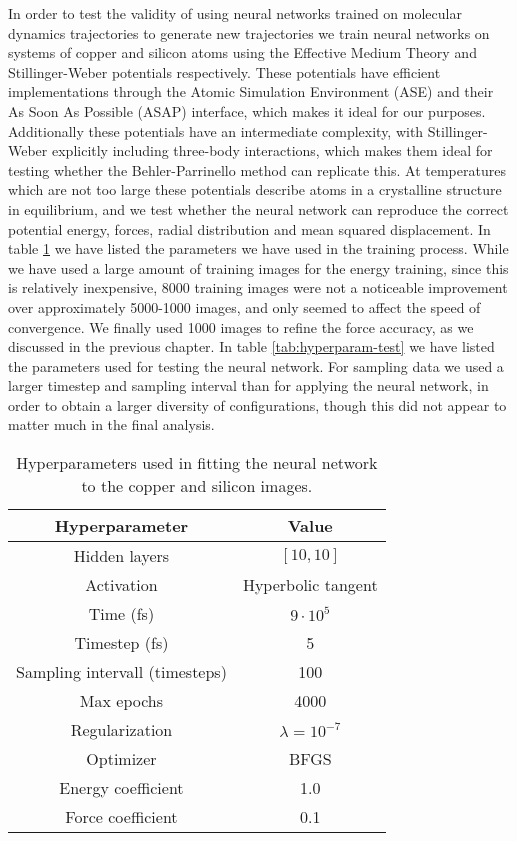 In order to test the validity of using neural networks trained
on molecular dynamics trajectories to generate new trajectories
we train neural networks on systems of copper and silicon atoms
using the Effective Medium Theory \cite{jacobsen1996semi}
and Stillinger-Weber \cite{che8002013} potentials
respectively.
These potentials have efficient implementations
through the Atomic Simulation Environment (ASE)
and their As Soon As Possible (ASAP) interface, which makes
it ideal for our purposes. Additionally these potentials
have an intermediate complexity, with Stillinger-Weber explicitly
including three-body interactions, which makes them ideal
for testing whether the Behler-Parrinello method \cite{behler2007generalized}
can replicate this.
At temperatures which are not too large these potentials describe
atoms in a crystalline structure in equilibrium,
and we test whether the neural network can reproduce the correct potential
energy, forces, radial distribution and mean squared displacement.
In table \ref{tab:hyperparam} we have listed the parameters we have
used in the training process. While we have used a large amount
of training images for the energy training, since this is relatively
inexpensive, 8000 training images were not a noticeable improvement
over approximately 5000-1000 images,
and only seemed to affect the speed of convergence.
We finally used 1000 images to refine the force accuracy,
as we discussed in the previous chapter.
In table \ref{tab:hyperparam-test} we have listed the parameters
used for testing the neural network. For sampling data we used a larger
timestep and sampling interval
than for applying the neural network, in order to obtain
a larger diversity of configurations, though this did not appear to
matter much in the final analysis.


\begin{table}[H]
\centering
\caption{Hyperparameters used in fitting the neural network
    to the copper and silicon images.}
\label{tab:hyperparam}
\begin{tabular}{|c c|}
\hline
Hyperparameter & Value \\
\hline \hline
    Hidden layers & $\left[10, 10\right]$ \\
Activation & Hyperbolic tangent \\
    Time (fs) & $9 \cdot 10^5$ \\
    Timestep (fs) & 5 \\
    Sampling intervall (timesteps) & 100 \\
Max epochs & 4000 \\
    Regularization & $\lambda = 10^{-7}$ \\
Optimizer & BFGS \\
Energy coefficient & 1.0 \\
Force coefficient & 0.1 \\
\hline
\end{tabular}
\end{table}

